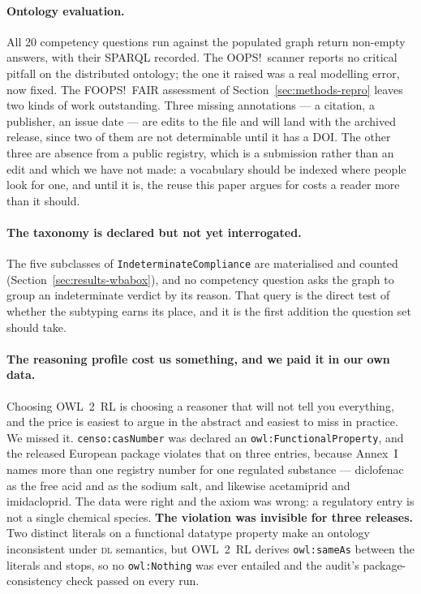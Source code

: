 \paragraph{Ontology evaluation.}
All \num{20} competency questions run against the populated graph return
non-empty answers, with their SPARQL
recorded. The OOPS!\ scanner
reports no critical pitfall on the distributed
ontology; the one it raised was a
real modelling error, now fixed. The FOOPS!\ FAIR assessment of
Section~\ref{sec:methods-repro} leaves two kinds of work outstanding. Three
missing annotations --- a citation, a publisher, an issue date --- are edits to
the file and will land with the archived release, since two of them are not
determinable until it has a DOI. The other three are absence from a public
registry, which is a submission rather than an edit and which we have not made:
a vocabulary should be indexed where people look for one, and until it is, the
reuse this paper argues for costs a reader more than it should.

\paragraph{The taxonomy is declared but not yet interrogated.}
The five subclasses of \texttt{IndeterminateCompliance} are materialised and
counted (Section~\ref{sec:results-wbabox}), and no competency question asks the
graph to group an indeterminate verdict by its reason. That query is the direct
test of whether the subtyping earns its place, and it is the first addition the
question set should take.

\paragraph{The reasoning profile cost us something, and we paid it in our own
data.} Choosing OWL~2~RL is choosing a reasoner that will not tell you
everything, and the price is easiest to argue in the abstract and easiest to
miss in practice. We missed it. \texttt{censo:casNumber} was declared an
\texttt{owl:FunctionalProperty}, and the released European package violates
that on three entries, because Annex~I names more than one registry number for
one regulated substance --- diclofenac as the free acid and as the sodium salt,
and likewise acetamiprid and imidacloprid. The data were right and the axiom was
wrong: a regulatory entry is not a single chemical species. \textbf{The
violation was invisible for three releases.} Two distinct literals on a
functional datatype property make an ontology inconsistent under \textsc{dl}
semantics, but OWL~2~RL derives \texttt{owl:sameAs} between the literals and
stops, so no \texttt{owl:Nothing} was ever entailed and the audit's
package-consistency check passed on every run.

